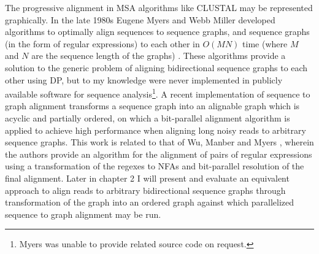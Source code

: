The progressive alignment in MSA algorithms like CLUSTAL may be represented graphically.
In the late 1980s Eugene Myers and Webb Miller developed algorithms to optimally align sequences to sequence graphs, and sequence graphs (in the form of regular expressions) to each other in $O(MN)$ time (where $M$ and $N$ are the sequence length of the graphs) \cite{myers1989approximate,wu1995subquadratic}.
These algorithms provide a solution to the generic problem of aligning bidirectional sequence graphs to each other using DP, but to my knowledge were never implemented in publicly available software for sequence analysis\footnote{Myers was unable to provide related source code on request.}.
A recent implementation of sequence to graph alignment \cite{rautiainen2018bit} transforms a sequence graph into an alignable graph which is acyclic and partially ordered, on which a bit-parallel alignment algorithm is applied to achieve high performance when aligning long noisy reads to arbitrary sequence graphs.
This work is related to that of Wu, Manber and Myers \cite{wu1995subquadratic}, wherein the authors provide an algorithm for the alignment of pairs of regular expressions using a transformation of the regexes to NFAs and bit-parallel resolution of the final alignment.
Later in chapter 2 I will present and evaluate an equivalent approach to align reads to arbitrary bidirectional sequence graphs through transformation of the graph into an ordered graph against which parallelized sequence to graph alignment may be run.

